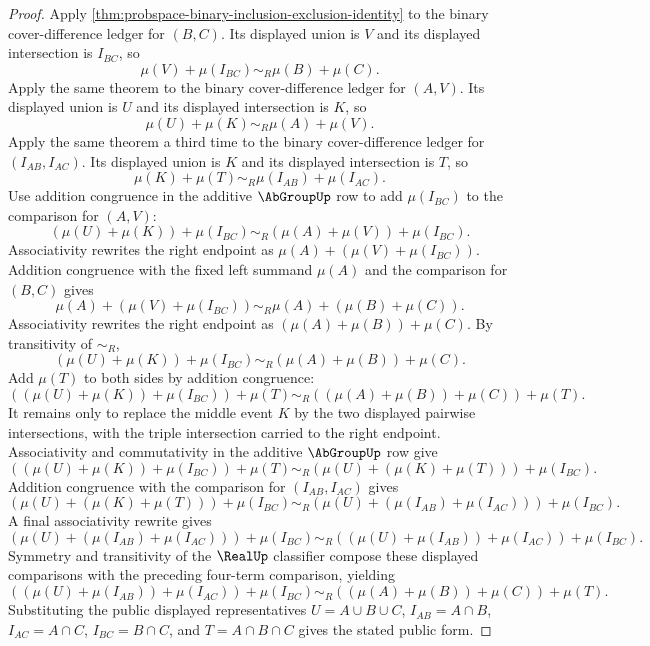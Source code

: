 \begin{proof}
Apply \autoref{thm:probspace-binary-inclusion-exclusion-identity} to the binary cover-difference ledger for $(B,C)$. Its displayed union is $V$ and its displayed intersection is $I_{BC}$, so
$$
\mu(V)+\mu(I_{BC})\sim_R\mu(B)+\mu(C).
$$
Apply the same theorem to the binary cover-difference ledger for $(A,V)$. Its displayed union is $U$ and its displayed intersection is $K$, so
$$
\mu(U)+\mu(K)\sim_R\mu(A)+\mu(V).
$$
Apply the same theorem a third time to the binary cover-difference ledger for $(I_{AB},I_{AC})$. Its displayed union is $K$ and its displayed intersection is $T$, so
$$
\mu(K)+\mu(T)\sim_R\mu(I_{AB})+\mu(I_{AC}).
$$
Use addition congruence in the additive $\AbGroupUp$ row to add $\mu(I_{BC})$ to the comparison for $(A,V)$:
$$
(\mu(U)+\mu(K))+\mu(I_{BC})\sim_R(\mu(A)+\mu(V))+\mu(I_{BC}).
$$
Associativity rewrites the right endpoint as $\mu(A)+(\mu(V)+\mu(I_{BC}))$. Addition congruence with the fixed left summand $\mu(A)$ and the comparison for $(B,C)$ gives
$$
\mu(A)+(\mu(V)+\mu(I_{BC}))\sim_R\mu(A)+(\mu(B)+\mu(C)).
$$
Associativity rewrites the right endpoint as $(\mu(A)+\mu(B))+\mu(C)$. By transitivity of $\sim_R$,
$$
(\mu(U)+\mu(K))+\mu(I_{BC})\sim_R(\mu(A)+\mu(B))+\mu(C).
$$
Add $\mu(T)$ to both sides by addition congruence:
$$
((\mu(U)+\mu(K))+\mu(I_{BC}))+\mu(T)\sim_R((\mu(A)+\mu(B))+\mu(C))+\mu(T).
$$
It remains only to replace the middle event $K$ by the two displayed pairwise intersections, with the triple intersection carried to the right endpoint. Associativity and commutativity in the additive $\AbGroupUp$ row give
$$
((\mu(U)+\mu(K))+\mu(I_{BC}))+\mu(T)\sim_R(\mu(U)+(\mu(K)+\mu(T)))+\mu(I_{BC}).
$$
Addition congruence with the comparison for $(I_{AB},I_{AC})$ gives
$$
(\mu(U)+(\mu(K)+\mu(T)))+\mu(I_{BC})\sim_R(\mu(U)+(\mu(I_{AB})+\mu(I_{AC})))+\mu(I_{BC}).
$$
A final associativity rewrite gives
$$
(\mu(U)+(\mu(I_{AB})+\mu(I_{AC})))+\mu(I_{BC})\sim_R((\mu(U)+\mu(I_{AB}))+\mu(I_{AC}))+\mu(I_{BC}).
$$
Symmetry and transitivity of the $\RealUp$ classifier compose these displayed comparisons with the preceding four-term comparison, yielding
$$
((\mu(U)+\mu(I_{AB}))+\mu(I_{AC}))+\mu(I_{BC})\sim_R((\mu(A)+\mu(B))+\mu(C))+\mu(T).
$$
Substituting the public displayed representatives $U=A\cup B\cup C$, $I_{AB}=A\cap B$, $I_{AC}=A\cap C$, $I_{BC}=B\cap C$, and $T=A\cap B\cap C$ gives the stated public form.
\end{proof}
